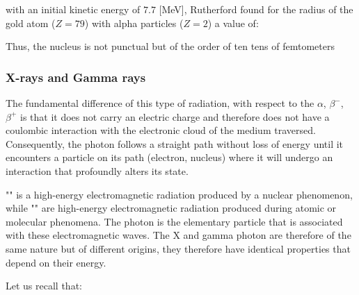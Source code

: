 	with an initial kinetic energy of $7.7$ [MeV], Rutherford found for the radius of the gold atom ($Z = 79$) with alpha particles ($Z = 2$) a value of:
	
	Thus, the nucleus is not punctual but of the order of ten tens of femtometers
	
	\subsubsection{X-rays and Gamma rays}
	The fundamental difference of this type of radiation, with respect to the $\alpha$, $\beta^-$, $\beta^+$ is that it does not carry an electric charge and therefore does not have a coulombic interaction with the electronic cloud of the medium traversed. Consequently, the photon follows a straight path without loss of energy until it encounters a particle on its path (electron, nucleus) where it will undergo an interaction that profoundly alters its state.

	"" is a high-energy electromagnetic radiation produced by a nuclear phenomenon, while "" are high-energy electromagnetic radiation produced during atomic or molecular phenomena. The photon is the elementary particle that is associated with these electromagnetic waves. The X and gamma photon are therefore of the same nature but of different origins, they therefore have identical properties that depend on their energy.

	Let us recall that:
	
